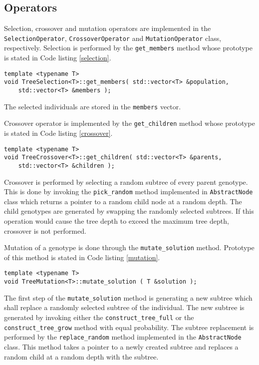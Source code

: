 \subsection{Operators}
Selection, crossover and mutation operators are implemented in the \\\texttt{SelectionOperator}, \texttt{CrossoverOperator} and \texttt{MutationOperator} class, respectively.
Selection is performed by the \texttt{get\_members} method whose prototype is stated in Code listing \ref{selection}.
\begin{lstlisting}[frame=none, label={selection}, caption={Prototype of the \texttt{get\_members} method which performs selection.}, captionpos=b]
template <typename T>
void TreeSelection<T>::get_members( std::vector<T> &population, 
	std::vector<T> &members );
\end{lstlisting}
The selected individuals are stored in the \texttt{members} vector.

Crossover operator is implemented by the \texttt{get\_children} method whose prototype is stated in Code listing \ref{crossover}.
\begin{lstlisting}[frame=none, label={crossover}, caption={Prototype of the \texttt{get\_children} method which performs crossover.}, captionpos=b]
template <typename T>
void TreeCrossover<T>::get_children( std::vector<T> &parents, 
	std::vector<T> &children );
\end{lstlisting}
Crossover is performed by selecting a random subtree of every parent genotype.
This is done by invoking the \texttt{pick\_random} method implemented in \texttt{AbstractNode} class which returns a pointer to a random child node at a random depth.
The child genotypes are generated by swapping the randomly selected subtrees.
If this operation would cause the tree depth to exceed the maximum tree depth, crossover is not performed.

Mutation of a genotype is done through the \texttt{mutate\_solution} method.
Prototype of this method is stated in Code listing \ref{mutation}.
\begin{lstlisting}[frame=none, label={mutation}, caption={Prototype of the \texttt{mutate\_solution} method.}, captionpos=b]
template <typename T>
void TreeMutation<T>::mutate_solution ( T &solution );
\end{lstlisting}
The first step of the \texttt{mutate\_solution} method is generating a new subtree which shall replace a randomly selected subtree of the individual.
The new subtree is generated by invoking either the \texttt{construct\_tree\_full} or the \texttt{construct\_tree\_grow} method with equal probability.
The subtree replacement is performed by the \texttt{replace\_random} method implemented in the \texttt{AbstractNode} class.
This method takes a pointer to a newly created subtree and replaces a random child at a random depth with the subtree.

